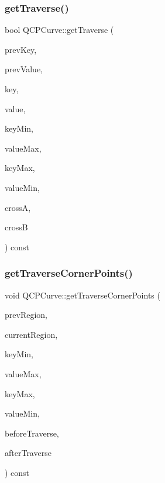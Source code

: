 \subsubsection{\texorpdfstring{get\+Traverse()}{getTraverse()}}
{\footnotesize\ttfamily bool Q\+C\+P\+Curve\+::get\+Traverse (\begin{DoxyParamCaption}\item[{double}]{prev\+Key,  }\item[{double}]{prev\+Value,  }\item[{double}]{key,  }\item[{double}]{value,  }\item[{double}]{key\+Min,  }\item[{double}]{value\+Max,  }\item[{double}]{key\+Max,  }\item[{double}]{value\+Min,  }\item[{Q\+PointF \&}]{crossA,  }\item[{Q\+PointF \&}]{crossB }\end{DoxyParamCaption}) const\hspace{0.3cm}{\ttfamily [protected]}}

\mbox{\label{class_q_c_p_curve_a55e24387fd97a2cad0def8a40809e9ec}} 
\subsubsection{\texorpdfstring{get\+Traverse\+Corner\+Points()}{getTraverseCornerPoints()}}
{\footnotesize\ttfamily void Q\+C\+P\+Curve\+::get\+Traverse\+Corner\+Points (\begin{DoxyParamCaption}\item[{int}]{prev\+Region,  }\item[{int}]{current\+Region,  }\item[{double}]{key\+Min,  }\item[{double}]{value\+Max,  }\item[{double}]{key\+Max,  }\item[{double}]{value\+Min,  }\item[{Q\+Vector$<$ Q\+PointF $>$ \&}]{before\+Traverse,  }\item[{Q\+Vector$<$ Q\+PointF $>$ \&}]{after\+Traverse }\end{DoxyParamCaption}) const\hspace{0.3cm}{\ttfamily [protected]}}

